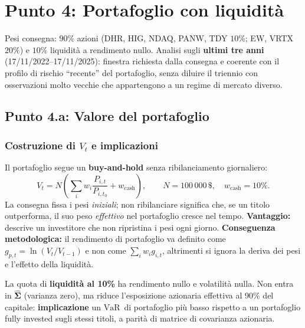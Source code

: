 \documentclass[12pt,a4paper]{article}
\newcommand{\VaR}{\ensuremath{\mathrm{VaR}}}
\newcommand{\USD}{\ensuremath{\,\$}}
\begin{document}
\section{Punto 4: Portafoglio con liquidità}

Pesi consegna: $90\%$ azioni (DHR, HIG, NDAQ, PANW, TDY $10\%$; EW, VRTX $20\%$) e $10\%$ liquidità a rendimento nullo. Analisi sugli \textbf{ultimi tre anni} (17/11/2022--17/11/2025): finestra richiesta dalla consegna e coerente con il profilo di rischio ``recente'' del portafoglio, senza diluire il triennio con osservazioni molto vecchie che appartengono a un regime di mercato diverso.

\subsection{Punto 4.a: Valore del portafoglio}

\subsubsection*{Costruzione di $V_t$ e implicazioni}

Il portafoglio segue un \textbf{buy-and-hold} senza ribilanciamento giornaliero:
\begin{equation}
  V_t = N\left(\sum_i w_i \frac{P_{i,t}}{P_{i,t_0}} + w_{\mathrm{cash}}\right),
  \qquad N=100\,000\USD,\quad w_{\mathrm{cash}}=10\%.
\end{equation}
La consegna fissa i pesi \emph{iniziali}; non ribilanciare significa che, se un titolo outperforma, il suo peso \emph{effettivo} nel portafoglio cresce nel tempo. \textbf{Vantaggio:} descrive un investitore che non ripristina i pesi ogni giorno. \textbf{Conseguenza metodologica:} il rendimento di portafoglio va definito come $g_{p,t}=\ln(V_t/V_{t-1})$ e non come $\sum_i w_i g_{i,t}$, altrimenti si ignora la deriva dei pesi e l'effetto della liquidità.

La quota di \textbf{liquidità al 10\%} ha rendimento nullo e volatilità nulla. Non entra in $\hat{\boldsymbol\Sigma}$ (varianza zero), ma riduce l'esposizione azionaria effettiva al 90\% del capitale: \textbf{implicazione} un \VaR\ di portafoglio più basso rispetto a un portafoglio fully invested sugli stessi titoli, a parità di matrice di covarianza azionaria.
\end{document}
